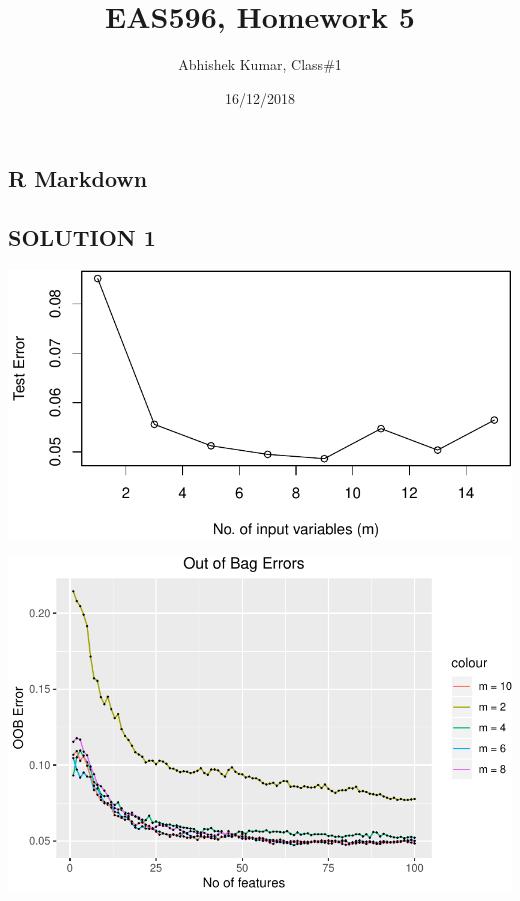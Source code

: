 \documentclass[]{article}
\title{EAS596, Homework 5}
\author{Abhishek Kumar, Class\#1}
\date{16/12/2018}
\begin{document}
\maketitle

\subsection{R Markdown}\label{r-markdown}

\subsection{SOLUTION 1}\label{solution-1}

\begin{center}\includegraphics{HW5_Solution_files/figure-latex/unnamed-chunk-1-1} \end{center}

\begin{center}\includegraphics{HW5_Solution_files/figure-latex/unnamed-chunk-1-2} \end{center}
\end{document}
